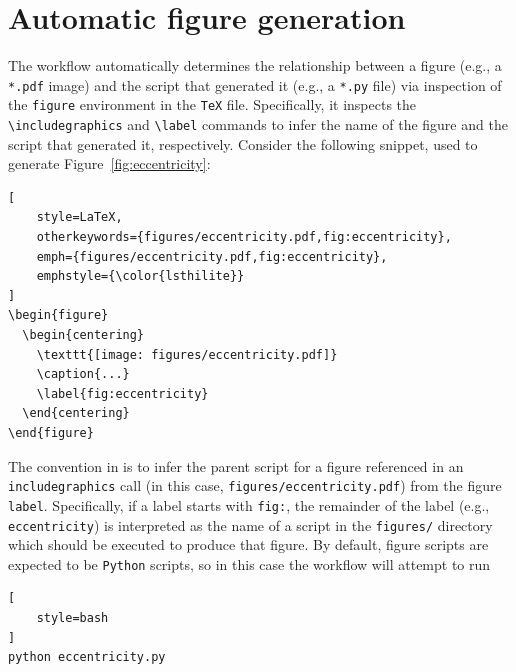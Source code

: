 \documentclass[twocolumn]{aastex631}
\begin{document}
\section{Automatic figure generation}
\label{sec:auto-fig}
%
The workflow automatically determines the relationship between a figure (e.g., a \texttt{*.pdf} image) and the script that generated it (e.g., a \texttt{*.py} file) via inspection of the \texttt{figure} environment in the \texttt{TeX} file. 
Specifically, it inspects the \texttt{{\textbackslash}includegraphics} and \texttt{{\textbackslash}label} commands to infer the name of the figure and the script that generated it, respectively.
Consider the following snippet, used to generate Figure~\ref{fig:eccentricity}:\\

\noindent\begin{minipage}{\linewidth}
\begin{lstlisting}[
    style=LaTeX,
    otherkeywords={figures/eccentricity.pdf,fig:eccentricity},
    emph={figures/eccentricity.pdf,fig:eccentricity},
    emphstyle={\color{lsthilite}}
]
\begin{figure}
  \begin{centering}
    \texttt{[image: figures/eccentricity.pdf]}
    \caption{...}
    \label{fig:eccentricity}
  \end{centering}
\end{figure}
\end{lstlisting}
\end{minipage}

\noindent The convention in \showyourwork is to infer the parent script for a figure referenced in an \texttt{includegraphics} call (in this case, {\color{lsthilite}\texttt{figures/eccentricity.pdf}}) from the figure \texttt{label}. 
Specifically, if a label starts with {\color{lsthilite}\texttt{fig:}}, the remainder of the label (e.g., {\color{lsthilite}\texttt{eccentricity}}) is interpreted as the name of a script in the \texttt{figures/} directory which should be executed to produce that figure. 
By default, figure scripts are expected to be \texttt{Python} scripts, so in this case the workflow will attempt to run\\

\noindent\begin{minipage}{\linewidth}
\begin{lstlisting}[
    style=bash
]
python eccentricity.py
\end{lstlisting}
\end{minipage}
\end{document}
